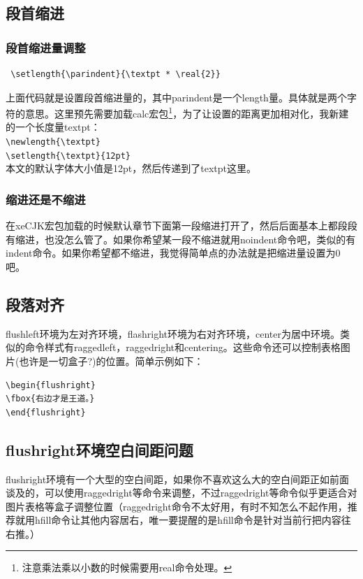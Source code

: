 \documentclass[12pt,oneside]{book}
\newlength{\textpt}
\begin{document}
\begin{common-format}
\subsection{段首缩进}
\subsubsection{段首缩进量调整}
\begin{Verbatim}
 \setlength{\parindent}{\textpt * \real{2}}
\end{Verbatim}

上面代码就是设置段首缩进量的，其中parindent是一个length量。具体就是两个字符的意思。这里预先需要加载calc宏包\footnote{注意乘法乘以小数的时候需要用real命令处理。}，为了让设置的距离更加相对化，我新建的一个长度量textpt：\\
\verb+\newlength{\textpt}+\\
\verb+\setlength{\textpt}{12pt}+\\ 
本文的默认字体大小值是12pt，然后传递到了textpt这里。


\subsubsection{缩进还是不缩进}
在xeCJK宏包加载的时候默认章节下面第一段缩进打开了，然后后面基本上都段段有缩进，也没怎么管了。如果你希望某一段不缩进就用noindent命令吧，类似的有indent命令。如果你希望都不缩进，我觉得简单点的办法就是把缩进量设置为0吧。



\subsection{段落对齐}
flushleft环境为左对齐环境，flashright环境为右对齐环境，center为居中环境。类似的命令样式有raggedleft，raggedright和centering。这些命令还可以控制表格图片(也许是一切盒子?)的位置。简单示例如下：

\begin{Verbatim}
\begin{flushright}
\fbox{右边才是王道。}
\end{flushright}
\end{Verbatim}
\begin{flushright}
\end{flushright}


\subsection{flushright环境空白间距问题}
flushright环境有一个大型的空白间距，如果你不喜欢这么大的空白间距正如前面谈及的，可以使用raggedright等命令来调整，不过raggedright等命令似乎更适合对图片表格等盒子调整位置（raggedright命令不太好用，有时不知怎么不起作用，推荐就用hfill命令让其他内容居右，唯一要提醒的是hfill命令是针对当前行把内容往右推。）


\end{common-format}
\end{document}
